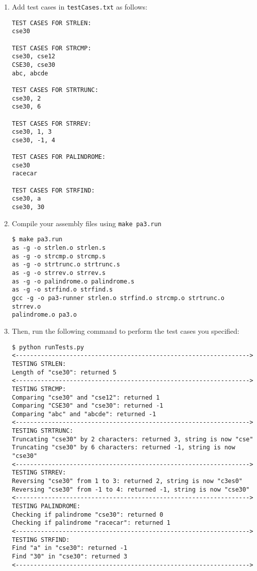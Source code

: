 \documentclass{article}
\begin{document}
\begin{enumerate}
\item  Add test cases in {\tt testCases.txt} as follows:

\begin{verbatim}
TEST CASES FOR STRLEN:
cse30

TEST CASES FOR STRCMP:
cse30, cse12
CSE30, cse30
abc, abcde

TEST CASES FOR STRTRUNC:
cse30, 2
cse30, 6

TEST CASES FOR STRREV:
cse30, 1, 3
cse30, -1, 4

TEST CASES FOR PALINDROME:
cse30
racecar

TEST CASES FOR STRFIND:
cse30, a
cse30, 30
\end{verbatim}

\item Compile your assembly files using {\tt make pa3.run}
\begin{verbatim}
$ make pa3.run
as -g -o strlen.o strlen.s
as -g -o strcmp.o strcmp.s
as -g -o strtrunc.o strtrunc.s
as -g -o strrev.o strrev.s
as -g -o palindrome.o palindrome.s
as -g -o strfind.o strfind.s
gcc -g -o pa3-runner strlen.o strfind.o strcmp.o strtrunc.o strrev.o 
palindrome.o pa3.o 
\end{verbatim}

\item Then, run the following command to perform the test cases you specified:
\begin{verbatim}
$ python runTests.py 
<----------------------------------------------------------------->
TESTING STRLEN:
Length of "cse30": returned 5
<----------------------------------------------------------------->
TESTING STRCMP:
Comparing "cse30" and "cse12": returned 1
Comparing "CSE30" and "cse30": returned -1
Comparing "abc" and "abcde": returned -1
<----------------------------------------------------------------->
TESTING STRTRUNC:
Truncating "cse30" by 2 characters: returned 3, string is now "cse"
Truncating "cse30" by 6 characters: returned -1, string is now "cse30"
<----------------------------------------------------------------->
TESTING STRREV:
Reversing "cse30" from 1 to 3: returned 2, string is now "c3es0"
Reversing "cse30" from -1 to 4: returned -1, string is now "cse30"
<----------------------------------------------------------------->
TESTING PALINDROME:
Checking if palindrome "cse30": returned 0
Checking if palindrome "racecar": returned 1
<----------------------------------------------------------------->
TESTING STRFIND:
Find "a" in "cse30": returned -1
Find "30" in "cse30": returned 3
<----------------------------------------------------------------->
\end{verbatim}
\end{enumerate}
\end{document}
